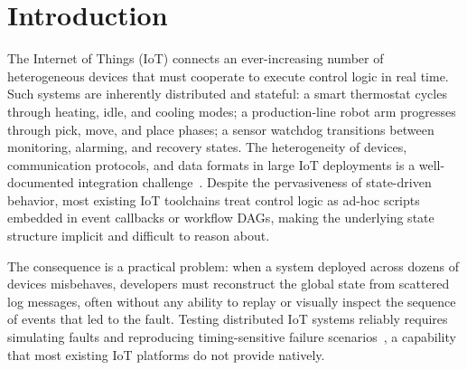 

\chapter{Introduction}

The Internet of Things (IoT) connects an ever-increasing number of heterogeneous devices that must cooperate to execute control logic in real time. Such systems are inherently distributed and stateful: a smart thermostat cycles through heating, idle, and cooling modes; a production-line robot arm progresses through pick, move, and place phases; a sensor watchdog transitions between monitoring, alarming, and recovery states. The heterogeneity of devices, communication protocols, and data formats in large IoT deployments is a well-documented integration challenge~\cite{Noaman2022}. Despite the pervasiveness of state-driven behavior, most existing IoT toolchains treat control logic as ad-hoc scripts embedded in event callbacks or workflow DAGs, making the underlying state structure implicit and difficult to reason about.

The consequence is a practical problem: when a system deployed across dozens of devices misbehaves, developers must reconstruct the global state from scattered log messages, often without any ability to replay or visually inspect the sequence of events that led to the fault. Testing distributed IoT systems reliably requires simulating faults and reproducing timing-sensitive failure scenarios~\cite{Beilharz2022}, a capability that most existing IoT platforms do not provide natively.

